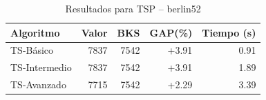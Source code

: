 \begin{table}[h]
\centering
\caption{Resultados para TSP -- berlin52}
\label{tab:tsp_berlin52}
\begin{tabular}{lrrrr}
\hline
\textbf{Algoritmo} & \textbf{Valor} & \textbf{BKS} & \textbf{GAP(\%)} & \textbf{Tiempo (s)} \\
\hline
TS-Básico & 7837 & 7542 & +3.91 & 0.91 \\
TS-Intermedio & 7837 & 7542 & +3.91 & 1.89 \\
TS-Avanzado & 7715 & 7542 & +2.29 & 3.39 \\
\hline
\end{tabular}
\end{table}
